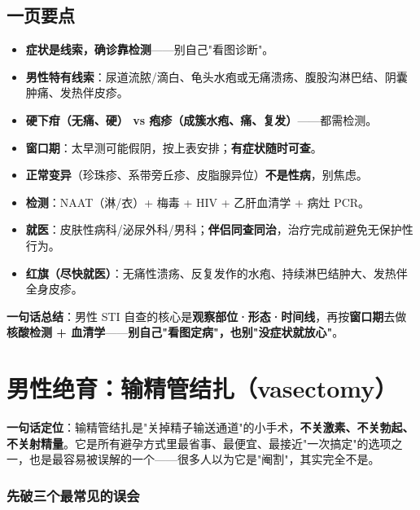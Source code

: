 \documentclass[12pt,UTF8,openany]{ctexbook}
\begin{document}
\section{一页要点}
\begin{itemize}[leftmargin=2em,itemsep=0.2em]
  \item \textbf{症状是线索，确诊靠检测}——别自己"看图诊断"。
  \item \textbf{男性特有线索}：尿道流脓/滴白、龟头水疱或无痛溃疡、腹股沟淋巴结、阴囊肿痛、发热伴皮疹。
  \item \textbf{硬下疳（无痛、硬） vs 疱疹（成簇水疱、痛、复发）}——都需检测。
  \item \textbf{窗口期}：太早测可能假阴，按上表安排；\textbf{有症状随时可查}。
  \item \textbf{正常变异}（珍珠疹、系带旁丘疹、皮脂腺异位）\textbf{不是性病}，别焦虑。
  \item \textbf{检测}：NAAT（淋/衣）+ 梅毒 + HIV + 乙肝血清学 + 病灶 PCR。
  \item \textbf{就医}：皮肤性病科/泌尿外科/男科；\textbf{伴侣同查同治}，治疗完成前避免无保护性行为。
  \item \textbf{红旗（尽快就医）}：无痛性溃疡、反复发作的水疱、持续淋巴结肿大、发热伴全身皮疹。
\end{itemize}

\vspace{1em}
\noindent\textbf{一句话总结}：男性 STI 自查的核心是\textbf{观察部位·形态·时间线}，再按\textbf{窗口期}去做\textbf{核酸检测 + 血清学}——\textbf{别自己"看图定病"，也别"没症状就放心"}。

\chapter{男性绝育：输精管结扎（vasectomy）}
\label{chap:vasectomy}

\textbf{一句话定位}：输精管结扎是"关掉精子输送通道"的小手术，\textbf{不关激素、不关勃起、不关射精量}。它是所有避孕方式里最省事、最便宜、最接近"一次搞定"的选项之一，也是最容易被误解的一个——很多人以为它是"阉割"，其实完全不是。

\subsection*{先破三个最常见的误会}
\end{document}
